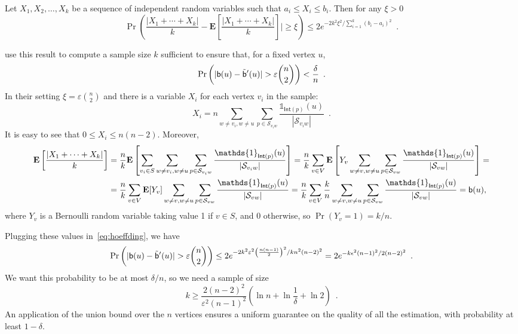 \begin{theorem}
  Let $X_1,X_2,\dotsc,X_k$ be a sequence of independent random variables
  such that $a_i\leq X_i\leq b_i$. Then for any $\xi > 0$
  \begin{equation}\label{eq:hoeffding}
    \Pr\left(\frac{|X_1+\dotsb+X_k|}{k}-\mathbf{E}\left[\frac{|X_1+\dotsb+X_k|}{k}\right]|\geq
    \xi\right)\leq 2e^{-2k^2\xi^2/\sum_{i=1}^{k}(b_{i}-a_{i})^2}\enspace.
  \end{equation}
\end{theorem}

\citet{BrandesP07} use this result to compute a sample size $k$ sufficient to ensure that, for
a fixed vertex $u$,
\[ 
\Pr\left(|\betw(u)-\tilde\betw'(u)|>\varepsilon\binom{n}{2}\right)<\frac{\delta}{n}\enspace.
\]
In their setting $\xi=\varepsilon\binom{n}{2}$ and there is a variable $X_i$ for
each vertex $v_i$ in the sample:
\[ 
X_i=n\sum_{w\neq v_i,w\neq
u}\sum_{p\in\mathcal{S}_{v_iw}}\frac{\mathds{1}_{\mathsf{Int}(p)}(u)}{|\mathcal{S}_{v_iw}|}\enspace
.
\]
It is easy to see that $0\le X_i\le n(n-2)$. Moreover,
\begin{align*}
\mathbf{E}\left[\frac{|X_1+\dotsb+X_k|}{k}\right] &=
\frac{n}{k}\mathbf{E}\left[\sum_{v_i\in S}\sum_{w\neq v_i,w\neq
u}\sum_{p\in\mathcal{S}_{v_iw}}\frac{\mathds{1}_{\mathsf{Int}(p)}(u)}{|\mathcal{S}_{v_iw}|}\right]
=\frac{n}{k}\sum_{v\in V}\mathbf{E}\left[Y_v\sum_{w\neq v,w\neq
u}\sum_{p\in\mathcal{S}_{vw}}\frac{\mathds{1}_{\mathsf{Int}(p)}(u)}{|\mathcal{S}_{vw}|}\right] =
\\
&=\frac{n}{k}\sum_{v\in V}\mathbf{E}[Y_v]\sum_{w\neq v,w\neq
u}\sum_{p\in\mathcal{S}_{vw}}\frac{\mathds{1}_{\mathsf{Int}(p)}(u)}{|\mathcal{S}_{vw}|}
=\frac{n}{k}\sum_{v\in V}\frac{k}{n}\sum_{w\neq v,w\neq
u}\sum_{p\in\mathcal{S}_{vw}}\frac{\mathds{1}_{\mathsf{Int}(p)}(u)}{|\mathcal{S}_{vw}|}
= \betw(u),
\end{align*}
where $Y_v$ is a Bernoulli random variable taking value 1 if $v\in S$, and 0
otherwise, so $\Pr(Y_v=1)=k/n$.

Plugging these values in~\eqref{eq:hoeffding}, we have
\[
\Pr\left(|\betw(u)-\tilde\betw'(u)|>\varepsilon\binom{n}{2}\right)\leq
2e^{-2k^2\varepsilon^2\left(\frac{n(n-1)}{2}\right)^2/kn^2(n-2)^2}=2e^{-k\epsilon^2(n-1)^2/2(n-2)^2}\enspace.
\]
We want this probability to be at most $\delta/n$, so we need a sample of size
\[
k\geq \frac{2(n-2)^2}{\varepsilon^2(n-1)^2}\left(\ln n
+\ln\frac{1}{\delta} +\ln 2\right)\enspace.
\]
An application of the union bound over the $n$ vertices ensures a uniform guarantee on the quality of
all the estimation, with probability at least $1-\delta$.

